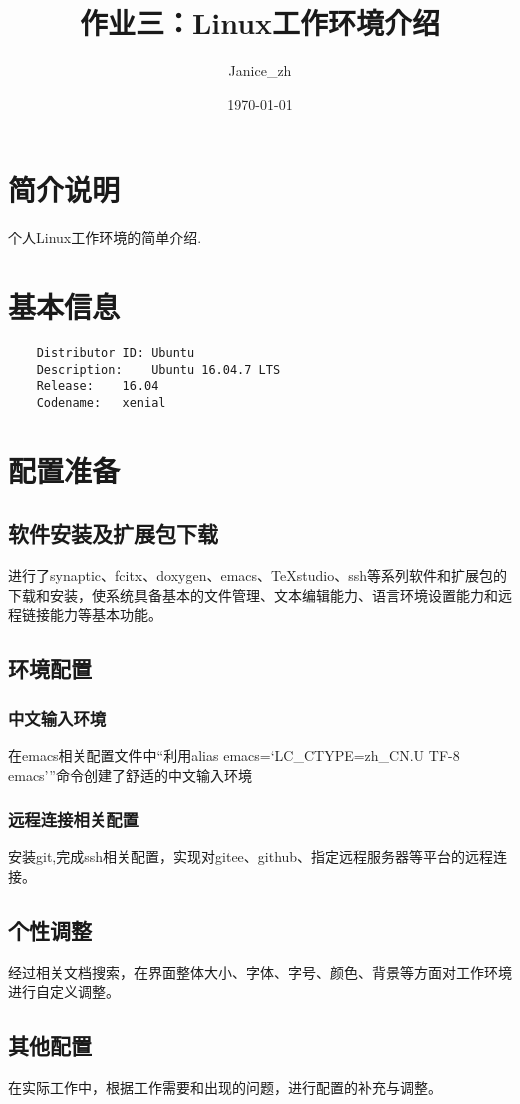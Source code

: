 \documentclass{article}
\title{作业三：Linux工作环境介绍}
\author{Janice\_zh}
\date{\today}
\begin{document}
	\maketitle   %
	\renewcommand{\contentsname}{目录}
	\tableofcontents  %
	\section{简介说明}
个人Linux工作环境的简单介绍.
	\section{基本信息}
\begin{verbatim}
	Distributor ID:	Ubuntu
	Description:	Ubuntu 16.04.7 LTS
	Release:	16.04
	Codename:	xenial
\end{verbatim}  
	\section{配置准备}
	\subsection{软件安装及扩展包下载}
 进行了synaptic、fcitx、doxygen、emacs、TeXstudio、ssh等系列软件和扩展包的下载和安装，使系统具备基本的文件管理、文本编辑能力、语言环境设置能力和远程链接能力等基本功能。\cite{R}
	 \subsection{环境配置}
	 \subsubsection{中文输入环境}
	 在emacs相关配置文件中``利用alias emacs=`LC\_CTYPE=zh\_CN.U
	 TF-8 emacs'''命令创建了舒适的中文输入环境
	 \subsubsection{远程连接相关配置}安装git,完成ssh相关配置，实现对gitee、github、指定远程服务器等平台的远程连接。
	 \subsection{个性调整}经过相关文档搜索，在界面整体大小、字体、字号、颜色、背景等方面对工作环境进行自定义调整。
	 \subsection{其他配置}
	 在实际工作中，根据工作需要和出现的问题，进行配置的补充与调整。
\end{document}
